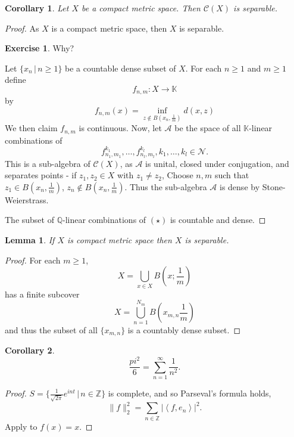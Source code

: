 \documentclass[10pt, oneside, reqno]{amsbook}
\theoremstyle{plain}%
\newtheorem{lem}[thm]{Lemma}
\newtheorem*{cor}{Corollary}
\theoremstyle{definition}
\newtheorem{exer}[thm]{Exercise}
\theoremstyle{remark}
\newcommand{\given}{ \, | \,}
\newcommand{\Q}{\mathbb{Q}}
\newcommand{\K}{\mathbb{K}}
\newcommand{\Z}{\mathbb{Z}}
\newcommand{\iprod}[1]{\left\langle #1 \right\rangle}
\begin{document}
\begin{cor}
    Let $X$ be a compact metric space.  Then $\mathcal C(X)$ is separable.
\end{cor}
\begin{proof}
    As $X$ is a compact metric space, then $X$ is separable.  
    \begin{exer}
        Why?
    \end{exer}
    Let $\{ x_n \given n \geq 1 \}$ be a countable dense subset of $X$.  For each $n \geq 1$ and $m \geq 1$ define \[
        f_{n,m} : X \rightarrow \K
    \] by \[f_{n,m}(x) = \inf_{z \notin B(x_n, \frac{1}{m})} d(x,z)\]
    We then claim $f_{n,m}$ is continuous.  Now, let $\mathcal{A}$ be the space of all $\K$-linear combinations of \begin{equation*}
        f^{k_1}_{n_1,m_1}, \dots, f_{n_l, m_l}^{k_l}, k_1, \dots, k_l \in \mathcal{N}. \tag{$\star$}
    \end{equation*}
 This is a sub-algebra of $\mathcal C(X)$, as $\mathcal A$ is unital, closed under conjugation, and separates points - if $z_1, z_2 \in X$ with $z_1 \neq z_2$, Choose $n,m$ such that $z_1 \in B(x_n, \frac{1}{m})$, $z_n \notin B(x_n, \frac{1}{m})$.  Thus the sub-algebra $\mathcal A$ is dense by Stone-Weierstrass.  
    
    The subset of $\Q$-linear combinations of $(\star)$ is countable and dense.
\end{proof}

\begin{lem}
    If $X$ is compact metric space then $X$ is separable.  
\end{lem}
\begin{proof}
    For each $m \geq 1$, \[
        X = \bigcup_{x \in X} B(x ; \frac{1}{m})
    \]  has a finite subcover \[
        X = \bigcup_{n=1}^{N_m} B(x_{m,n} \frac{1}{m})
    \] and thus the subset of all $\{x_{m,n} \}$ is a countably dense subset. 
\end{proof}

\begin{cor}
    \[
    \frac{pi^2}{6} = \sum_{n = 1}^\infty \frac{1}{n^2}.
    \] 
\end{cor}

\begin{proof}
    $S = \{ \frac{1}{\sqrt{2 \pi}} e^{i nt } \given n \in \Z \}$ is complete, and so Parseval's formula holds, \[
        \| f \|_2^2 = \sum_{ n \in \Z} | \iprod{f, e_n} |^2.
    \]  Apply to $f(x) = x$.  
\end{proof}
\end{document}
